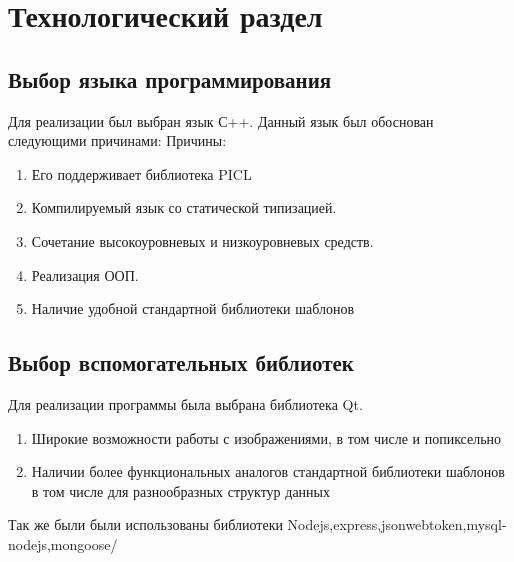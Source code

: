 \chapter{Технологический раздел}
\section{Выбор  языка программирования}
Для реализации  был выбран язык  С++. Данный язык был обоснован следующими причинами:
Причины:
\begin{enumerate}
	 \item Его поддерживает библиотека PICL
	 \item Компилируемый язык со статической типизацией. 
	 \item Сочетание высокоуровневых и низкоуровневых средств.
	 \item Реализация ООП.
	 \item Наличие удобной стандартной библиотеки шаблонов
	 \end{enumerate}
\section{Выбор вспомогательных библиотек}
Для реализации программы была выбрана библиотека Qt.
\begin{enumerate}
	\item Широкие возможности работы с изображениями, в том числе и попиксельно
	\item Наличии более функциональных аналогов стандартной библиотеки шаблонов в том числе для разнообразных структур данных
\end{enumerate}
Так же были были использованы библиотеки Nodejs,express,jsonwebtoken,mysql-nodejs,mongoose/
